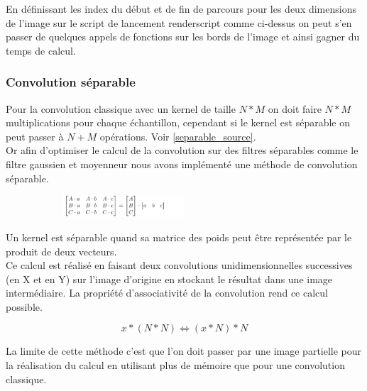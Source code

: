         En définissant les index du début et de fin de parcours pour les deux dimensions de l'image sur le script de lancement renderscript
        comme ci-dessus on peut s'en passer de quelques appels de fonctions sur les bords de l'image et ainsi gagner du temps de calcul.

    \subsubsection*{Convolution séparable} \label{conv_separable}

        Pour la convolution classique avec un kernel de taille $N*M$ on doit faire $N*M$ multiplications pour chaque échantillon,
        cependant si le kernel est séparable on peut passer à $N+M$ opérations. Voir \ref{separable_source}.
        \\

        Or afin d'optimiser le calcul de la convolution sur des filtres séparables comme le filtre gaussien et moyenneur nous avons implémenté une
        méthode de convolution séparable.
        
        \begin{figure}[!h]
            \centering
            \begin{subfigure}[b]{1\textwidth}
                \centering
                \includegraphics[width=0.5\textwidth]{report_src/separableConv1.png}
            \end{subfigure}
        \end{figure}

        Un kernel est séparable quand sa matrice des poids peut être représentée par le produit de deux vecteurs.
        \\

        Ce calcul est réalisé en faisant deux convolutions unidimensionnelles successives (en X et en Y) sur l'image d'origine en stockant le résultat dans une image intermédiaire.
        La propriété d'associativité de la convolution rend ce calcul possible.

        \[
            x * (N * N)  \iff (x * N) * N
        \]

        La limite de cette méthode c'est que l'on doit passer par une image partielle pour la réalisation du calcul en
        utilisant plus de mémoire que pour une convolution classique.
        \\



